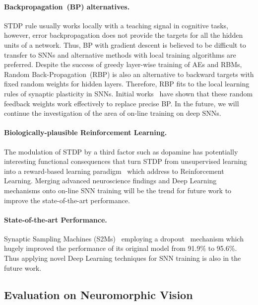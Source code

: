 \paragraph{Backpropagation~(BP) alternatives.}
STDP rule usually works locally with a teaching signal in cognitive tasks, however, error backpropagation does not provide the targets for all the hidden units of a network.
Thus, BP with gradient descent is believed to be difficult to transfer to SNNs and alternative methods with local training algorithms are preferred.
Despite the success of greedy layer-wise training of AEs and RBMs, Random Back-Propagation~(RBP) is also an alternative to backward targets with fixed random weights for hidden layers.
Therefore, RBP fits to the local learning rules of synaptic plasticity in SNNs.
Initial works~\citep{samadi2017deep,neftci2017event} have shown that these random feedback weights work effectively to replace precise BP.  
In the future, we will continue the investigation of the area of on-line training on deep SNNs.

\paragraph{Biologically-plausible Reinforcement Learning.}
The modulation of STDP by a third factor such as dopamine has potentially interesting functional consequences that turn STDP from unsupervised learning into a reward-based learning paradigm~\citep{izhikevich2007solving} which address to Reinforcement Learning.
Merging advanced neuroscience findings and Deep Learning mechanisms onto on-line SNN training will be the trend for future work to improve the state-of-the-art performance.


\paragraph{State-of-the-art Performance.}
Synaptic Sampling Machines (S2Ms)~\citep{neftci2016stochastic} employing a dropout~\citep{srivastava2014dropout} mechanism which hugely improved the performance of its original model from 91.9\% to 95.6\%.
Thus applying novel Deep Learning techniques for SNN training is also in the future work.


\subsection{Evaluation on Neuromorphic Vision}

